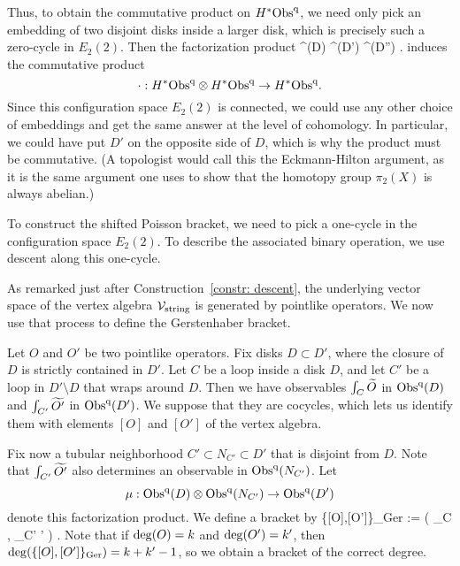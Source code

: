 Thus, to obtain the commutative product on $H^*\Obs^\q$, 
we need only pick an embedding of two disjoint disks inside a larger disk,
which is precisely such a zero-cycle in $E_2(2)$.
Then the factorization product
\ben
\Obs^\q(D) \tensor \Obs^\q(D') \to \Obs^\q(D'') .
\een 
induces the commutative product
\[
\cdot: H^*\Obs^\q \otimes H^*\Obs^\q \to H^*\Obs^\q.
\]
Since this configuration space $E_2(2)$ is connected, 
we could use any other choice of embeddings and get the same answer at the level of cohomology.
In particular, we could have put $D'$ on the opposite side of $D$,
which is why the product must be commutative.
(A topologist would call this the Eckmann-Hilton argument,
as it is the same argument one uses to show that the homotopy group $\pi_2(X)$ is always abelian.)

To construct the shifted Poisson bracket, 
we need to pick a one-cycle in the configuration space $E_2(2)$.
To describe the associated binary operation, 
we use descent along this one-cycle.

As remarked just after Construction~\ref{constr: descent},
the underlying vector space of the vertex algebra $\cV_{\rm string}$ is generated by pointlike operators.
We now use that process to define the Gerstenhaber bracket.

Let $O$ and $O'$ be two pointlike operators. 
Fix disks $D \subset D'$, 
where the closure of $D$ is strictly contained in $D'$. 
Let $C$ be a loop inside a disk $D$, and let $C'$ be a loop in $D'\setminus D$ that wraps around $D$.
Then we have observables $\int_C \Tilde{O}$ in $\Obs^\q(D)$ and $\int_{C'} \Tilde{O'}$ in $\Obs^\q(D')$.
We suppose that they are cocycles,
which lets us identify them with elements $[O]$ and $[O']$ of the vertex algebra.

Fix now a tubular neighborhood $C' \subset N_{C'} \subset D'$  that is disjoint from $D$.
Note that $\int_{C'} \Tilde{O'}$ also determines an observable in $\Obs^\q(N_{C'})$.
Let 
\[
\mu : \Obs^\q(D) \tensor \Obs^\q (N_{C'}) \to \Obs^\q(D')
\] 
denote this factorization product.
We define a bracket by 
\ben
\{[O],[O']\}_{\rm Ger} := \mu \left( \int_C , \int_{C'} ' \right) .
\een 
Note that if ${\rm deg}(O) = k$ and ${\rm deg}(O') = k'$, then ${\rm deg}(\{[O],[O']\}_{\rm Ger}) = k+k' -1$, 
so we obtain a bracket of the correct degree.

